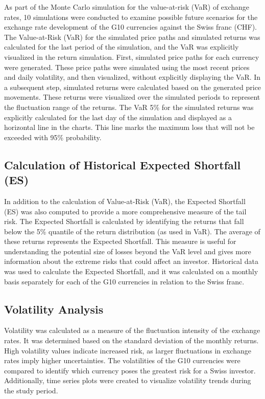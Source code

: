 \documentclass{article}
\begin{document}
As part of the Monte Carlo simulation for the value-at-risk (VaR) of exchange rates, 10 simulations were conducted to examine possible future scenarios for the exchange rate development of the G10 currencies against the Swiss franc (CHF). The Value-at-Risk (VaR) for the simulated price paths and simulated returns was calculated for the last period of the simulation, and the VaR was explicitly visualized in the return simulation.
First, simulated price paths for each currency were generated. These price paths were simulated using the most recent prices and daily volatility, and then visualized, without explicitly displaying the VaR.
In a subsequent step, simulated returns were calculated based on the generated price movements. These returns were visualized over the simulated periods to represent the fluctuation range of the returns. The VaR 5\% for the simulated returns was explicitly calculated for the last day of the simulation and displayed as a horizontal line in the charts. This line marks the maximum loss that will not be exceeded with 95\% probability.

\subsection{Calculation of Historical Expected Shortfall (ES)}

In addition to the calculation of Value-at-Risk (VaR), the Expected Shortfall (ES) was also computed to provide a more comprehensive measure of the tail risk. The Expected Shortfall is calculated by identifying the returns that fall below the 5\% quantile of the return distribution (as used in VaR). The average of these returns represents the Expected Shortfall. This measure is useful for understanding the potential size of losses beyond the VaR level and gives more information about the extreme risks that could affect an investor. Historical data was used to calculate the Expected Shortfall, and it was calculated on a monthly basis separately for each of the G10 currencies in relation to the Swiss franc.

\subsection{Volatility Analysis}

Volatility was calculated as a measure of the fluctuation intensity of the exchange rates. It was determined based on the standard deviation of the monthly returns. High volatility values indicate increased risk, as larger fluctuations in exchange rates imply higher uncertainties. The volatilities of the G10 currencies were compared to identify which currency poses the greatest risk for a Swiss investor. Additionally, time series plots were created to visualize volatility trends during the study period.
\end{document}
